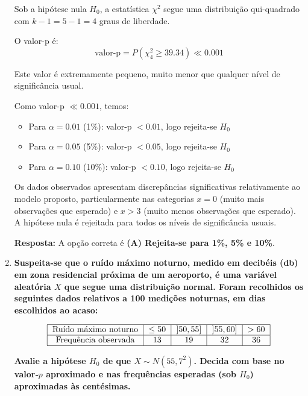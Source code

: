 \documentclass[a4paper,12pt]{article}
\begin{document}
\begin{enumerate}
\begin{mdframed}[backgroundcolor=gray!10,linewidth=0pt,innertopmargin=10pt,innerbottommargin=10pt]
    Sob a hipótese nula $H_0$, a estatística $\chi^2$ segue uma distribuição qui-quadrado com $k - 1 = 5 - 1 = 4$ graus de liberdade.

    O valor-p é:
    \[
    \text{valor-p} = P(\chi^2_4 \geq 39.34) \ll 0.001
    \]

    Este valor é extremamente pequeno, muito menor que qualquer nível de significância usual.

    Como valor-p $\ll 0.001$, temos:
    \begin{itemize}
        \item Para $\alpha = 0.01$ (1\%): valor-p $< 0.01$, logo rejeita-se $H_0$
        \item Para $\alpha = 0.05$ (5\%): valor-p $< 0.05$, logo rejeita-se $H_0$
        \item Para $\alpha = 0.10$ (10\%): valor-p $< 0.10$, logo rejeita-se $H_0$
    \end{itemize}

    Os dados observados apresentam discrepâncias significativas relativamente ao modelo proposto, particularmente nas categorias $x = 0$ (muito mais observações que esperado) e $x > 3$ (muito menos observações que esperado). A hipótese nula é rejeitada para todos os níveis de significância usuais.

    \textbf{Resposta:} A opção correta é \textbf{(A) Rejeita-se para 1\%, 5\% e 10\%}.
    \end{mdframed}

    \vspace{0.5cm}

    \item \textbf{Suspeita‐se que o ruído máximo noturno, medido em decibéis (db) em zona residencial próxima de um aeroporto, é uma variável aleatória \( X \) que segue uma distribuição normal. Foram recolhidos os seguintes dados relativos a 100 medições noturnas, em dias escolhidos ao acaso:}

    \[
    \begin{tabular}{|c|c|c|c|c|}
    \hline
    Ruído máximo noturno & \(\le50\) & \(]50,55]\) & \(]55,60]\) & \(>60\) \\ 
    \hline
    Frequência observada  & 13        & 19           & 32           & 36        \\
    \hline
    \end{tabular}
    \]

    \textbf{Avalie a hipótese \(H_0\) de que \(X\sim N(55,7^2)\). Decida com base no valor‑\(p\) aproximado e nas frequências esperadas (sob \(H_0\)) aproximadas às centésimas.}


\end{enumerate}
\end{document}
